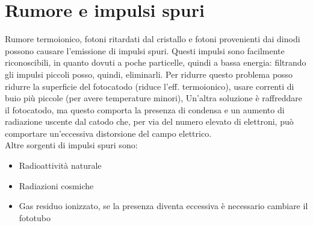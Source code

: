 \section{Rumore e impulsi spuri}
Rumore termoionico, fotoni ritardati dal cristallo e fotoni provenienti dai dinodi possono causare l'emissione di impulsi spuri.
Questi impulsi sono facilmente riconoscibili, in quanto dovuti a poche particelle, quindi a bassa energia:
filtrando gli impulsi piccoli posso, quindi, eliminarli.
Per ridurre questo problema posso ridurre la superficie del fotocatodo (riduce l'eff. termoionico), usare correnti di buio pi\`u piccole (per avere temperature minori),
Un'altra soluzione \`e raffreddare il fotocatodo, ma questo comporta la presenza di condensa e un aumento di radiazione uscente dal catodo che, per via del numero
elevato di elettroni, pu\`o comportare un'eccessiva distorsione del campo elettrico.\\
Altre sorgenti di impulsi spuri sono:
\begin{itemize}
\item Radioattivit\`a naturale
\item Radiazioni cosmiche
\item Gas residuo ionizzato, se la presenza diventa eccessiva \`e necessario cambiare il fototubo
\end{itemize}